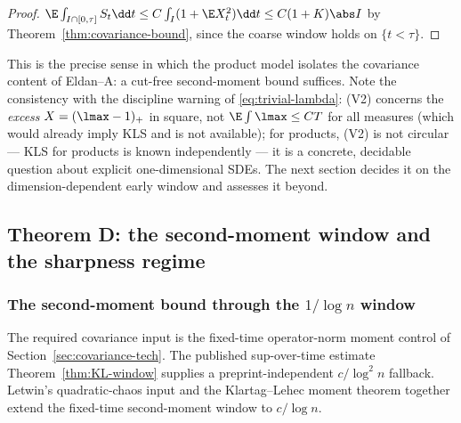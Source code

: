 \documentclass[../../main.tex]{subfiles}
\begin{document}
\begin{proof}
$\E\int_{I\cap[0,\tau]}S_t\dd t\le C\int_I(1+\E X_t^2)\dd t\le C(1+K)\abs I$ by
Theorem~\ref{thm:covariance-bound}, since the coarse window holds on $\{t<\tau\}$.
\end{proof}

\begin{remark}
This is the precise sense in which the product model isolates the covariance content of
Eldan--A: a cut-free second-moment bound suffices. Note the consistency with the discipline
warning of \eqref{eq:trivial-lambda}: (V2) concerns the \emph{excess} $X=(\lmax-1)_+$ in square,
not $\E\int\lmax\le CT$ for all measures (which would already imply KLS and is not available);
for products, (V2) is not circular --- KLS for products is known independently --- it is a
concrete, decidable question about explicit one-dimensional SDEs. The next section decides it
on the dimension-dependent early window and assesses it beyond.
\end{remark}

\subsection{Theorem D: the second-moment window and the sharpness regime}
\label{sec:window}

\subsubsection{\texorpdfstring{The second-moment bound through the $1/\log n$ window}{The
second-moment bound through the 1/log n window}}

The required covariance input is the fixed-time operator-norm moment control of
Section~\ref{sec:covariance-tech}. The published sup-over-time estimate
Theorem~\ref{thm:KL-window} supplies a preprint-independent $c/\log^2n$ fallback. Letwin's
quadratic-chaos input and the Klartag--Lehec moment theorem together extend the fixed-time
second-moment window to $c/\log n$.
\end{document}
